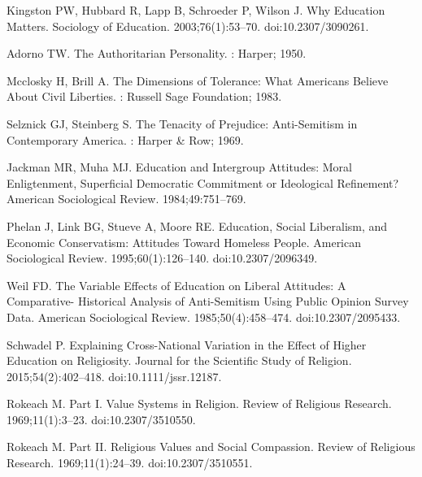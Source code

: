 \documentclass[10pt,letterpaper]{article}
\begin{document}
\begin{thebibliography}{10}
Kingston PW, Hubbard R, Lapp B, Schroeder P, Wilson J.
\newblock Why {{Education Matters}}.
\newblock Sociology of Education. 2003;76(1):53--70.
\newblock doi:{10.2307/3090261}.

Adorno TW.
\newblock The {{Authoritarian Personality}}.
: {Harper}; 1950.

Mcclosky H, Brill A.
\newblock The {{Dimensions}} of {{Tolerance}}: {{What Americans Believe About
  Civil Liberties}}.
: {Russell Sage Foundation}; 1983.

Selznick GJ, Steinberg S.
\newblock The {{Tenacity}} of {{Prejudice}}: Anti-{{Semitism}} in
  {{Contemporary America}}.
: {Harper \& Row}; 1969.

Jackman MR, Muha MJ.
\newblock Education and {{Intergroup Attitudes}}: {{Moral Enligtenment}},
  {{Superficial Democratic Commitment}} or {{Ideological Refinement}}?
\newblock American Sociological Review. 1984;49:751--769.

Phelan J, Link BG, Stueve A, Moore RE.
\newblock Education, {{Social Liberalism}}, and {{Economic Conservatism}}:
  {{Attitudes Toward Homeless People}}.
\newblock American Sociological Review. 1995;60(1):126--140.
\newblock doi:{10.2307/2096349}.

Weil FD.
\newblock The {{Variable Effects}} of {{Education}} on {{Liberal Attitudes}}:
  {{A Comparative}}- {{Historical Analysis}} of {{Anti}}-{{Semitism Using
  Public Opinion Survey Data}}.
\newblock American Sociological Review. 1985;50(4):458--474.
\newblock doi:{10.2307/2095433}.

Schwadel P.
\newblock Explaining {{Cross}}-{{National Variation}} in the {{Effect}} of
  {{Higher Education}} on {{Religiosity}}.
\newblock Journal for the Scientific Study of Religion. 2015;54(2):402--418.
\newblock doi:{10.1111/jssr.12187}.

Rokeach M.
\newblock Part {{I}}. {{Value Systems}} in {{Religion}}.
\newblock Review of Religious Research. 1969;11(1):3--23.
\newblock doi:{10.2307/3510550}.

Rokeach M.
\newblock Part {{II}}. {{Religious Values}} and {{Social Compassion}}.
\newblock Review of Religious Research. 1969;11(1):24--39.
\newblock doi:{10.2307/3510551}.


\end{thebibliography}
\end{document}
